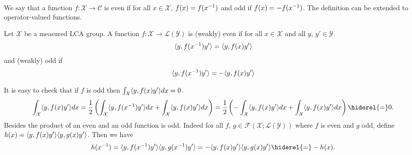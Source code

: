 \paragraph{}
We say that a function $f:\mathcal{X}\to\mathcal{C}$ is even if for all $x\in\mathcal{X}$, $f(x)=f({x}^{-1})$ and odd if $f(x)=-f({x}^{-1})$. The definition can be extended to operator-valued functions.
\begin{definition}
Let $\mathcal{X}$ be a measured LCA group. A function $f:\mathcal{X}\to\mathcal{L}(\mathcal{Y})$ is (weakly) even if for all $x\in\mathcal{X}$ and all $y$, $y'\in\mathcal{Y}$
\begin{dmath}
\inner{y,f(\inv{x})y'}=\inner{y,f(x)y'}
\end{dmath}
and (weakly) odd if
\begin{dmath}
\inner{y,f(\inv{x})y'}=-\inner{y,f(x)y'}
\end{dmath}
\end{definition}
It is easy to check that if $f$ is odd then $\int_{\mathcal{X}}\langle y,f(x)y'\rangle dx=0$.
\begin{dmath*}
\int_{\mathcal{X}}\inner{y,f(x)y'}dx=\frac{1}{2}\left(\int_{\mathcal{X}}\inner{y,f(\inv{x})y'}dx + \int_{\mathcal{X}}\inner{y,f(x)y'}dx\right)
=\frac{1}{2}\left(-\int_{\mathcal{X}}\inner{y,f(x)y'}dx + \int_{\mathcal{X}}\inner{y,f(x)y'}dx\right)\hiderel{=}0.
\end{dmath*}
Besides the product of an even and an odd function is odd. Indeed for all $f$, $g\in\mathcal{F}(\mathcal{X};\mathcal{L}(\mathcal{Y}))$ where $f$ is even and $g$ odd, define $h(x)=\langle y,f(x)y'\rangle\langle y,g(x)y'\rangle$. Then we have 
\begin{dmath}
h(\inv{x})=\inner{y,f(\inv{x})y'}\inner{y,g(\inv{x})y'}=-\inner{y,f(x)y'}\inner{y,g(x)y'}\hiderel{=}-h(x).
\end{dmath}
